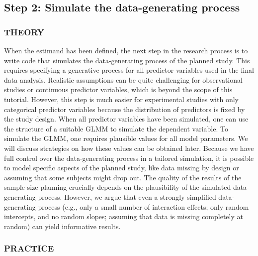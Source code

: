 \documentclass[
  man,
  floatsintext,
  longtable,
  a4paper,
  nolmodern,
  notxfonts,
  notimes,
  colorlinks=true,linkcolor=blue,citecolor=blue,urlcolor=blue]{apa7}
\begin{document}
\subsection{Step 2: Simulate the data-generating
process}\label{step-2-simulate-the-data-generating-process}

\subsubsection{THEORY}\label{theory-1}

When the estimand has been defined, the next step in the research
process is to write code that simulates the data-generating process of
the planned study. This requires specifying a generative process for all
predictor variables used in the final data analysis. Realistic
assumptions can be quite challenging for observational studies or
continuous predictor variables, which is beyond the scope of this
tutorial. However, this step is much easier for experimental studies
with only categorical predictor variables because the distribution of
predictors is fixed by the study design. When all predictor variables
have been simulated, one can use the structure of a suitable GLMM to
simulate the dependent variable. To simulate the GLMM, one requires
plausible values for all model parameters. We will discuss strategies on
how these values can be obtained later. Because we have full control
over the data-generating process in a tailored simulation, it is
possible to model specific aspects of the planned study, like data
missing by design or assuming that some subjects might drop out. The
quality of the results of the sample size planning crucially depends on
the plausibility of the simulated data-generating process. However, we
argue that even a strongly simplified data-generating process (e.g.,
only a small number of interaction effects; only random intercepts, and
no random slopes; assuming that data is missing completely at random)
can yield informative results.

\subsubsection{PRACTICE}\label{practice-1}
\end{document}
